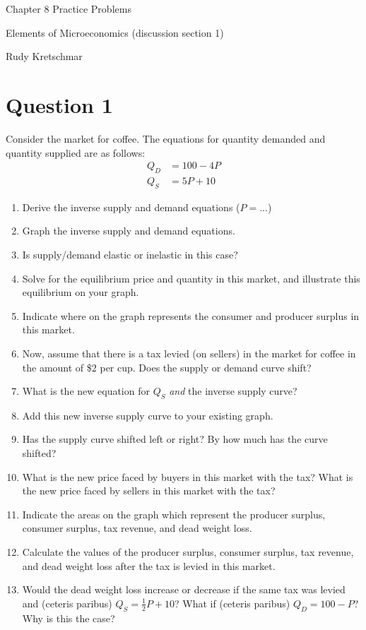 \documentclass[12pt]{article}
\begin{document}
\begin{center}
\Large Chapter 8 Practice Problems

\medskip

\normalsize Elements of Microeconomics (discussion section 1)

\medskip

\small Rudy Kretschmar
\end{center}

\section*{Question 1}
Consider the market for coffee. The equations for quantity demanded and quantity supplied are as follows:
\begin{align*}
    Q_D &= 100-4P\\
    Q_S &= 5P + 10
\end{align*}
\begin{enumerate}[label=(\alph*)]

    \item Derive the inverse supply and demand equations ($P = ...$)
    \item Graph the inverse supply and demand equations.
    \item Is supply/demand elastic or inelastic in this case?
    \item Solve for the equilibrium price and quantity in this market, and illustrate this equilibrium on your graph.
    \item Indicate where on the graph represents the consumer and producer surplus in this market.
    \item Now, assume that there is a tax levied (on sellers) in the market for coffee in the amount of \$2 per cup. Does the supply or demand curve shift?
    \item What is the new equation for $Q_S$ \textit{and} the inverse supply curve?
    \item Add this new inverse supply curve to your existing graph. 
    \item Has the supply curve shifted left or right? By how much has the curve shifted?
    \item What is the new price faced by buyers in this market with the tax? What is the new price faced by sellers in this market with the tax?
    \item Indicate the areas on the graph which represent the producer surplus, consumer surplus, tax revenue, and dead weight loss.
    \item Calculate the values of the producer surplus, consumer surplus, tax revenue, and dead weight loss after the tax is levied in this market.
    \item Would the dead weight loss increase or decrease if the same tax was levied and (ceteris paribus) $Q_S = \frac{1}{2}P + 10$? What if (ceteris paribus) $Q_D = 100 - P$? Why is this the case? 
\end{enumerate}
\end{document}
